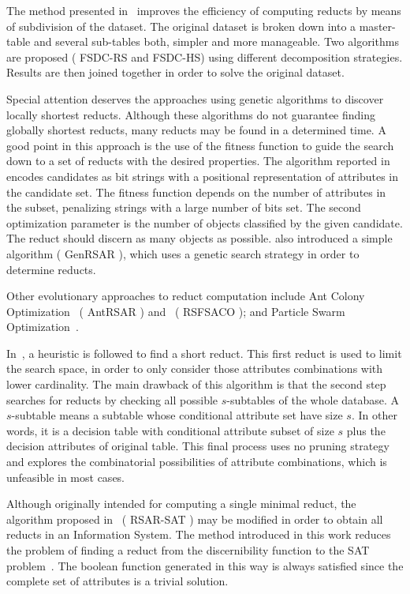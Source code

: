\documentclass[authoryear,11pt]{elsarticle}
\makeatletter
\newcommand{\setword}[2]{%
  \phantomsection
  #1\def\@currentlabel{\unexpanded{#1}}\label{#2}%
}
\makeatother
\begin{document}
  The method presented in~\citep{Jiao10} improves the efficiency of computing reducts by means of subdivision 
  of the dataset. The original dataset is broken down into a master-table and several sub-tables both, simpler
  and more manageable. Two algorithms are proposed (\setword{FSDC-RS}{FSDCRS} and FSDC-HS) using 
  different decomposition strategies. Results are then joined together in order to solve the original dataset. 
    
  Special attention deserves the approaches using genetic algorithms to discover locally shortest reducts. Although 
  these algorithms do not guarantee finding globally shortest reducts, many reducts may be found in a determined
  time. A good point in this approach is the use of the fitness function to guide the search down to a set of 
  reducts with the desired properties. The algorithm reported in~\citep{Wroblewski95} encodes candidates as bit 
  strings with a positional representation of attributes in the candidate set. The fitness function
  depends on the number of attributes in the subset, penalizing strings with a large number of bits set. The 
  second optimization parameter is the number of objects classified by the given candidate. The reduct should 
  discern as many objects as possible. \cite{Jensen03} also introduced a simple algorithm 
  (\setword{GenRSAR}{GenRSAR}), which uses a genetic search strategy in order to determine reducts.
  
  Other evolutionary approaches to reduct computation include Ant Colony Optimization~\citep{Jensen03} 
  (\setword{AntRSAR}{AntRSAR}) and~\citep{Chen10} (\setword{RSFSACO}{RSFSACO}); and Particle Swarm 
  Optimization~\citep{Wang07}.
    
  In~\citep{Lin04}, a heuristic is followed to find a short reduct. This first reduct is used to limit the search
  space, in order to only consider those attributes combinations with lower cardinality. 
  The main drawback of this algorithm is that the second step searches for reducts by checking all possible 
  $s$-subtables of the whole database. A $s$-subtable means a subtable whose conditional attribute set have 
  size $s$. In other words, it is a decision table with conditional attribute subset of size $s$ plus the decision
  attributes of original table. This final process uses no pruning strategy and explores the combinatorial
  possibilities of attribute combinations, which is unfeasible in most cases.
  
  Although originally intended for computing a single minimal reduct, the algorithm proposed in~\citep{Jensen14}
  (\setword{RSAR-SAT}{RSARSAT}) may be modified in order to obtain all reducts in an Information System. 
  The method introduced in this work
  reduces the problem of finding a reduct from the discernibility function to the SAT problem~\citep{Davis62}. 
  The boolean function generated in this way is always satisfied since the complete set of attributes is a trivial
  solution.
  
\end{document}
